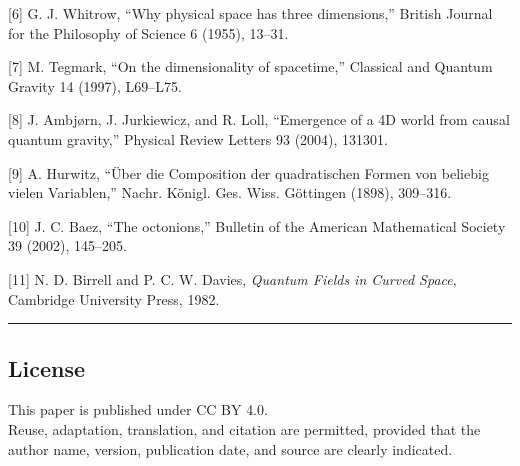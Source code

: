 \documentclass[
]{ltjsarticle}
\begin{document}
{[}6{]} G. J. Whitrow, ``Why physical space has three dimensions,''
British Journal for the Philosophy of Science 6 (1955), 13--31.

{[}7{]} M. Tegmark, ``On the dimensionality of spacetime,'' Classical
and Quantum Gravity 14 (1997), L69--L75.

{[}8{]} J. Ambjørn, J. Jurkiewicz, and R. Loll, ``Emergence of a 4D
world from causal quantum gravity,'' Physical Review Letters 93 (2004),
131301.

{[}9{]} A. Hurwitz, ``Über die Composition der quadratischen Formen von
beliebig vielen Variablen,'' Nachr. Königl. Ges. Wiss. Göttingen (1898),
309--316.

{[}10{]} J. C. Baez, ``The octonions,'' Bulletin of the American
Mathematical Society 39 (2002), 145--205.

{[}11{]} N. D. Birrell and P. C. W. Davies, \emph{Quantum Fields in
Curved Space}, Cambridge University Press, 1982.

\begin{center}\rule{0.5\linewidth}{0.5pt}\end{center}

\subsection{License}\label{license}

This paper is published under CC BY 4.0.\\
Reuse, adaptation, translation, and citation are permitted, provided
that the author name, version, publication date, and source are clearly
indicated.
\end{document}
